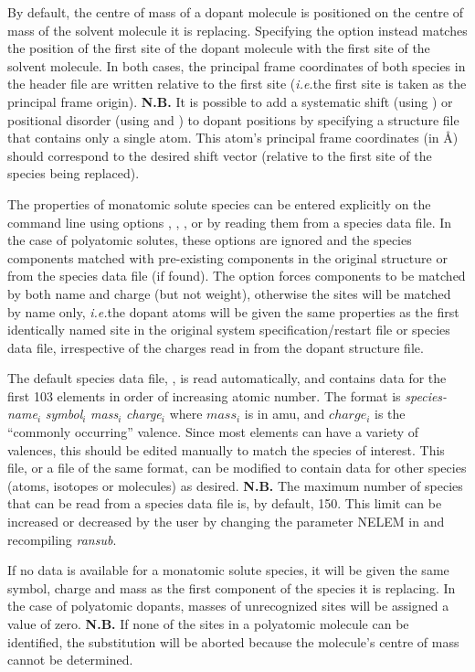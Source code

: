\documentclass[a4paper,twoside]{report}
\newcommand{\ie}{\emph{i.e.}}
\begin{document}
By default, the centre of mass of a dopant molecule is positioned on the centre of mass of the solvent molecule it
is replacing. Specifying the  option instead matches the position of the first site of the dopant molecule with
the first site of the solvent molecule. In both cases, the principal frame coordinates of both species in the
header file are written relative to the first site (\ie the first site is taken as the principal frame origin). \textbf{N.B.} It
is possible to add a systematic shift (using ) or positional disorder (using  and ) to dopant positions 
by specifying a structure file that contains only a single atom. This atom's
principal frame coordinates (in {\AA}) should correspond to the desired shift vector (relative to the first site 
of the species being
replaced).

The properties of monatomic solute species can be entered explicitly on the command
line using options , , , or by reading them
from a species data file. In the case of polyatomic solutes, these options are ignored and the species components
matched with pre-existing components in the original structure or from the species data file (if found). The  option
forces components to be matched by both name and charge (but not weight), otherwise 
the sites will be matched by name only, \ie the dopant atoms will be given the same properties as the first
identically named site in the original system specification/restart file or species data file, irrespective 
of the charges read in from the dopant structure file.

 The default species data file,
, is read automatically, and contains data for the
first 103 elements in order of increasing atomic number. The format is
{\textit{species-name}$_{i}$ %
                  \textit{symbol}$_{i}$ \textit{mass}$_{i}$} \textit{charge}$_{i}$
where $mass_{i}$ is in amu, and $charge_{i}$ is the ``commonly occurring'' valence.
Since most elements can have a variety of valences, this
should be edited manually to match the species of interest. This file,
or a file of the same format, can be
modified to contain data for other species (atoms, isotopes or molecules)
as desired. \textbf{N.B.} The maximum number of species that can be
read from a species data file is, by default, 150. This limit can be
increased or decreased by the user by changing the parameter NELEM in
 and recompiling \emph{ransub}.

If no data is available for a monatomic solute species, it
will be given the same symbol, charge and mass as the first component
of the species it is replacing. In the case of polyatomic dopants,
masses of unrecognized sites will be assigned a value of zero. \textbf{N.B.}
If none of the sites in a polyatomic molecule can be identified, the substitution will
be aborted because the molecule's centre of mass cannot be determined.
\end{document}
